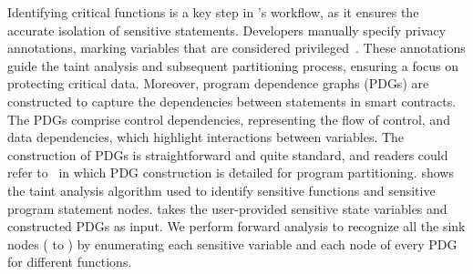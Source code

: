 Identifying critical functions is a key step in \tool's workflow, as it ensures the accurate isolation of sensitive statements.
Developers manually specify privacy annotations, marking \secrete variables that are considered privileged~\cite{zdancewic2002secure}. 
These annotations guide the taint analysis and subsequent partitioning process, ensuring a focus on protecting critical data.
Moreover,
program dependence graphs (PDGs) are constructed to capture the dependencies between statements in smart contracts. 
The PDGs comprise control dependencies, representing the flow of control, and data dependencies, which highlight interactions between variables. 
The construction of PDGs is straightforward and quite standard, and readers could refer to~\cite{liu2017ptrsplit} in which PDG construction is detailed for program partitioning. 
 shows the taint analysis algorithm used to identify sensitive functions and sensitive program statement nodes.
 takes the user-provided sensitive state variables and constructed PDGs as input.
We perform forward analysis to recognize all the sink nodes ( to ) by enumerating each sensitive variable and each node of every PDG for different functions.
